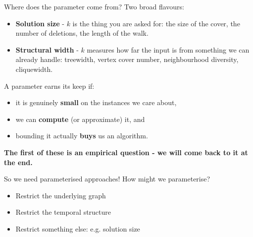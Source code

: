\documentclass[10pt, compress]{beamer}
\begin{document}
\begin{frame}{Where does the parameter come from?}
Two broad flavours:

\begin{itemize}
\item \textbf{Solution size} - $k$ is the thing you are asked for: the size of the cover, the number of deletions, the length of the walk.
\item \textbf{Structural width} - $k$ measures how far the input is from something we can already handle: treewidth, vertex cover number, neighbourhood diversity, cliquewidth.
\end{itemize}

\bigskip

A parameter earns its keep if:
\begin{itemize}
\item it is genuinely \textbf{small} on the instances we care about,
\item we can \textbf{compute} (or approximate) it, and
\item bounding it actually \textbf{buys} us an algorithm.
\end{itemize}

\bigskip

\textbf{The first of these is an empirical question - we will come back to it at the end.}
\end{frame}



\begin{frame}{So we need parameterised approaches!}
How might we parameterise?
\begin{itemize}
    \item Restrict the underlying graph
    \item Restrict the temporal structure
    \item Restrict something else: e.g. solution size
\end{itemize}
\end{frame}
\end{document}
